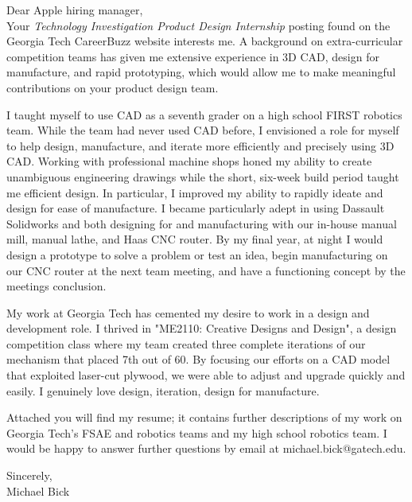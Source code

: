 \documentclass[10pt]{letter}
\begin{document}
Dear Apple hiring manager,\\
Your \textit{Technology Investigation Product Design Internship} posting found on the Georgia Tech CareerBuzz website interests me. A background on extra-curricular competition teams has given me extensive experience in 3D CAD, design for manufacture, and rapid prototyping, which would allow me to make meaningful contributions on your product design team.

I taught myself to use CAD as a seventh grader on a high school FIRST robotics team. While the team had never used CAD before, I envisioned a role for myself to help design, manufacture, and iterate more efficiently and precisely using 3D CAD. Working with professional machine shops honed my ability to create unambiguous engineering drawings while the short, six-week build period taught me efficient design. In particular, I improved my ability to rapidly ideate and design for ease of manufacture. I became particularly adept in using Dassault Solidworks and both designing for and manufacturing with our in-house manual mill, manual lathe, and Haas CNC router. By my final year, at night I would design a prototype to solve a problem or test an idea, begin manufacturing on our CNC router at the next team meeting, and have a functioning concept by the meetings conclusion.

My work at Georgia Tech has cemented my desire to work in a design and development role. I thrived in "ME2110: Creative Designs and Design", a design competition class where my team created three complete iterations of our mechanism that placed 7th out of 60. By focusing our efforts on a CAD model that exploited laser-cut plywood, we were able to adjust and upgrade quickly and easily. I genuinely love design, iteration, design for manufacture.

Attached you will find my resume; it contains further descriptions of my work on Georgia Tech's FSAE and robotics teams and my high school robotics team. I would be happy to answer further questions by email at michael.bick@gatech.edu.

Sincerely,\\
Michael Bick
\end{document}
